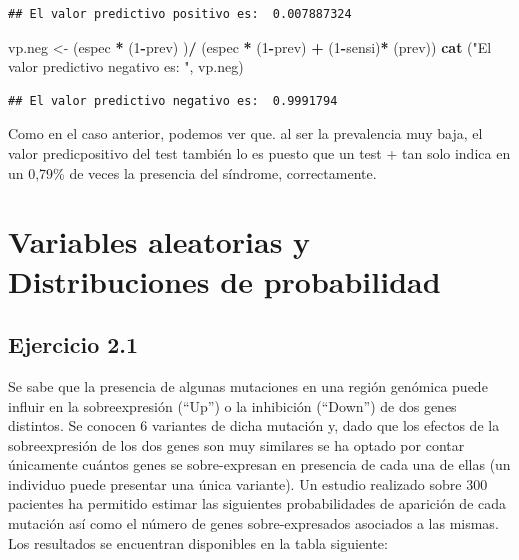 \documentclass[
]{article}
\newenvironment{Shaded}{\begin{snugshade}}{\end{snugshade}}
\newcommand{\DecValTok}[1]{\textcolor[rgb]{0.00,0.00,0.81}{#1}}
\newcommand{\FunctionTok}[1]{\textcolor[rgb]{0.13,0.29,0.53}{\textbf{#1}}}
\newcommand{\NormalTok}[1]{#1}
\newcommand{\OtherTok}[1]{\textcolor[rgb]{0.56,0.35,0.01}{#1}}
\newcommand{\SpecialCharTok}[1]{\textcolor[rgb]{0.81,0.36,0.00}{\textbf{#1}}}
\newcommand{\StringTok}[1]{\textcolor[rgb]{0.31,0.60,0.02}{#1}}
\begin{document}
\begin{verbatim}
## El valor predictivo positivo es:  0.007887324
\end{verbatim}

\begin{Shaded}
\begin{Highlighting}[]
\NormalTok{vp.neg }\OtherTok{\textless{}{-}}\NormalTok{ (espec }\SpecialCharTok{*}\NormalTok{ (}\DecValTok{1}\SpecialCharTok{{-}}\NormalTok{prev) )}\SpecialCharTok{/}\NormalTok{ (espec }\SpecialCharTok{*}\NormalTok{ (}\DecValTok{1}\SpecialCharTok{{-}}\NormalTok{prev) }\SpecialCharTok{+}\NormalTok{ (}\DecValTok{1}\SpecialCharTok{{-}}\NormalTok{sensi)}\SpecialCharTok{*}\NormalTok{ (prev))}
\FunctionTok{cat}\NormalTok{ (}\StringTok{"El valor predictivo negativo es: "}\NormalTok{, vp.neg)}
\end{Highlighting}
\end{Shaded}

\begin{verbatim}
## El valor predictivo negativo es:  0.9991794
\end{verbatim}

Como en el caso anterior, podemos ver que. al ser la prevalencia muy baja, el valor predicpositivo del test también lo es puesto que un test + tan solo indica en un 0,79\% de veces la presencia del síndrome, correctamente.

\section{Variables aleatorias y Distribuciones de probabilidad}\label{variables-aleatorias-y-distribuciones-de-probabilidad}

\subsection{Ejercicio 2.1}\label{ejercicio-2.1}

Se sabe que la presencia de algunas mutaciones en una región genómica puede influir en la sobreexpresión (``Up'') o la inhibición (``Down'') de dos genes distintos. Se conocen 6 variantes de dicha mutación y, dado que los efectos de la sobreexpresión de los dos genes son muy similares se ha optado por contar únicamente cuántos genes se sobre-expresan en presencia de cada una de ellas (un individuo puede presentar una única variante). Un estudio realizado sobre 300 pacientes ha permitido estimar las siguientes probabilidades de aparición de cada mutación así como el número de genes sobre-expresados asociados a las mismas. Los resultados se encuentran disponibles en la tabla siguiente:
\end{document}
